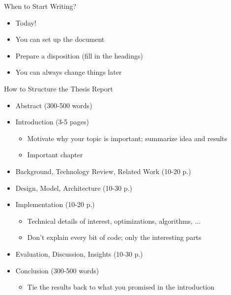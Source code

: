 \documentclass[hyperref={pdfpagelabels=false}, aspectratio=1610,handout]{beamer}
\begin{document}
\begin{frame}
\begin{block}{When to Start Writing?}
 \begin{itemize}
  \item<2-> Today!
  \item<2-> You can set up the document 
  \item<2-> Prepare a disposition (fill in the headings)
  \item<2-> You can always change things later
 \end{itemize}
\end{block}
\end{frame}

\begin{frame}
\begin{block}{How to Structure the Thesis Report}
 \begin{itemize}
  \item Abstract (300-500 words)
  \item Introduction (3-5 pages)
  \begin{itemize}
  	\item Motivate why your topic is important; summarize idea and results
	\item Important chapter
  \end{itemize}
  \item Background, Technology Review, Related Work (10-20 p.)
  \item Design, Model, Architecture (10-30 p.)
  \item Implementation (10-20 p.)
  \begin{itemize}
   \item Technical details of interest, optimizations, algorithms, ...
   \item Don't explain every bit of code; only the interesting parts
  \end{itemize}
  \item Evaluation, Discussion, Insights (10-30 p.)
  \item Conclusion (300-500 words)
  \begin{itemize}
  	\item Tie the results back to what you promised in the introduction
  \end{itemize}
 \end{itemize}
\end{block}
\end{frame}
\end{document}
